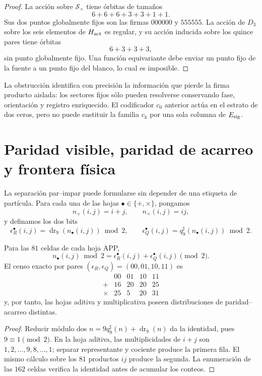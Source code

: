 \begin{proof}
La acción sobre \(\mathcal S_\times\) tiene órbitas de tamaños
\[
 6+6+6+3+3+1+1.
\]
Sus dos puntos globalmente fijos son las firmas
\(000000\) y \(555555\). La acción de \(D_3\) sobre los seis elementos de
\(H_{\rm act}\) es regular, y su acción inducida sobre los quince pares tiene
órbitas
\[
 6+3+3+3,
\]
sin punto globalmente fijo. Una función equivariante debe enviar un punto
fijo de la fuente a un punto fijo del blanco, lo cual es imposible.
\end{proof}

La obstrucción identifica con precisión la información que pierde la firma
producto aislada: los sectores fijos sólo pueden resolverse conservando fase,
orientación y registro enriquecido. El codificador \(c_0\) anterior actúa en
el estrato de dos ceros, pero no puede sustituir la familia \(c_k\) por una
sola columna de \(E_{\rm sig}\).

\section{Paridad visible, paridad de acarreo y frontera física}

La separación par--impar puede formularse sin depender de una etiqueta de
partícula. Para cada una de las hojas
\(\bullet\in\{+,\times\}\), pongamos
\[
 n_+(i,j)=i+j,
 \qquad
 n_\times(i,j)=ij,
\]
y definamos los dos bits
\[
 \epsilon_R^\bullet(i,j)
 =\operatorname{dr}_9(n_\bullet(i,j))\bmod2,
 \qquad
 \epsilon_Q^\bullet(i,j)
 =q_9^\sharp(n_\bullet(i,j))\bmod2.
\]

\begin{theorem}
\label{thm:factorizacion-paridad-acarreo}
Para las \(81\) celdas de cada hoja APP,
\[
 \boxed{
 n_\bullet(i,j)\bmod2
 =\epsilon_R^\bullet(i,j)+\epsilon_Q^\bullet(i,j)\pmod2.}
\]
El censo exacto por pares
\((\epsilon_R,\epsilon_Q)=(00,01,10,11)\) es
\[
 \begin{array}{c|rrrr}
  &00&01&10&11\\
 \hline
 +&16&20&20&25\\
 \times&25&5&20&31
 \end{array}
\]
y, por tanto, las hojas aditiva y multiplicativa poseen distribuciones de
paridad--acarreo distintas.
\end{theorem}

\begin{proof}
Reducir módulo dos
\(n=9q_9^\sharp(n)+\operatorname{dr}_9(n)\) da la identidad, pues
\(9\equiv1\pmod2\). En la hoja aditiva, las multiplicidades de \(i+j\) son
\(1,2,\ldots,9,8,\ldots,1\); separar representante y cociente produce la
primera fila. El mismo cálculo sobre los \(81\) productos \(ij\) produce la
segunda. La enumeración de las \(162\) celdas verifica la identidad antes de
acumular los conteos.\qedhere
\end{proof}

